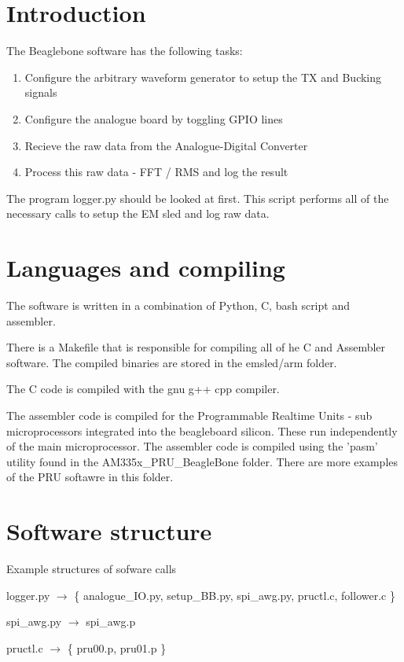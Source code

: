 \documentclass{report}
\begin{document}
\section{Introduction}

The Beaglebone software has the following tasks:
\begin{enumerate}
\item Configure the arbitrary waveform generator to setup the TX and Bucking signals
\item Configure the analogue board by toggling GPIO lines
\item Recieve the raw data from the Analogue-Digital Converter
\item Process this raw data - FFT / RMS and log the result
\end{enumerate}

The program logger.py should be looked at first.  This script performs all of the necessary calls to setup the EM sled and log raw data.

\section{Languages and compiling}


The software is written in a combination of Python, C, bash script and assembler.

There is a Makefile that is responsible for compiling all of he C and Assembler software.  The compiled binaries are stored in the emsled/arm folder.


The C code is compiled with the gnu g++ cpp compiler.

The assembler code is compiled for the Programmable Realtime Units - sub microprocessors integrated into the beagleboard silicon.  These run independently of the main microprocessor.    The assembler code is compiled using the 'pasm' utility found in the AM335x\_PRU\_BeagleBone folder.  There are more examples of the PRU softawre in this folder.


\section{Software structure}

Example structures of sofware calls

logger.py $\rightarrow$ \{ analogue\_IO.py, setup\_BB.py, spi\_awg.py, pructl.c, follower.c \}

spi\_awg.py $\rightarrow$ spi\_awg.p 

pructl.c $\rightarrow$ \{ pru00.p, pru01.p \} 
\end{document}
